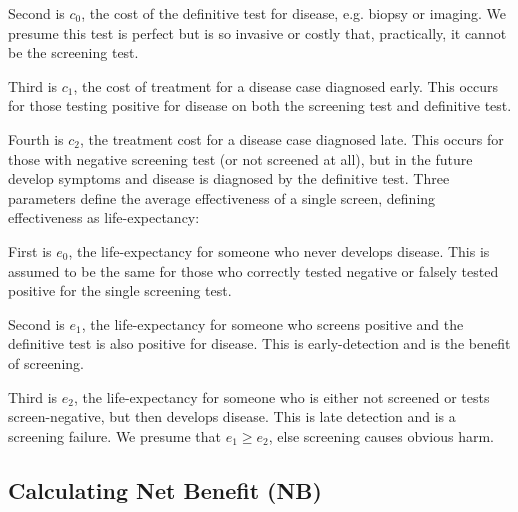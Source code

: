 \documentclass[AMA,STIX1COL]{WileyNJD-v2}
\begin{document}
Second is $c_0$, the cost of the definitive test for disease, e.g. biopsy or imaging.  We presume this test is perfect but is so invasive or costly that, practically, it cannot be the screening test.  

Third is $c_1$, the cost of treatment for a disease case diagnosed early.  This occurs for those testing positive for disease on both the screening test and definitive test.  

Fourth is $c_2$, the treatment cost for a disease case diagnosed late.  This occurs for those with negative screening test (or not screened at all), but in the future develop symptoms and disease is diagnosed by the definitive test.
\newline
\newline
\noindent  Three parameters define the average effectiveness of a single screen, defining effectiveness as life-expectancy:  

First is $e_0$, the life-expectancy for someone who never develops disease.  This is assumed to be the same for those who correctly tested negative or falsely tested positive for the single screening test.

Second is $e_1$, the life-expectancy for someone who screens positive and the definitive test is also positive for disease.  This is early-detection and is the benefit of screening.  

Third is $e_2$, the life-expectancy for someone who is either not screened or tests screen-negative, but then develops disease.  This is late detection and is a screening failure.  We presume that $e_1 \ge e_2$, else screening causes obvious harm. 


\subsection{Calculating Net Benefit (NB)}
\label{sec:INB}

\end{document}
